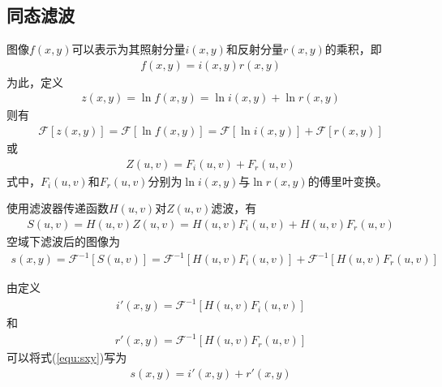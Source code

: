 \documentclass{hitreport}
\begin{document}
\subsection{同态滤波}\label{sec:tongtai}

图像$f\left(x,y\right)$可以表示为其照射分量$i\left(x,y\right)$和反射分量$r\left(x,y\right)$的乘积，即
\begin{align}
f\left(x,y\right) = i\left(x,y\right)r\left(x,y\right)
\end{align}
为此，定义
\begin{align}
z\left(x,y\right) = \ln f\left(x,y\right) = \ln i\left(x,y\right) + \ln r\left(x,y\right)
\end{align}
则有
\begin{align}
\mathscr{F}\left[z\left(x,y\right)\right] = \mathscr{F}\left[\ln f\left(x,y\right)\right] = \mathscr{F}\left[\ln i\left(x,y\right)\right] + \mathscr{F}\left[r\left(x,y\right)\right]
\end{align}
或
\begin{align}
Z\left(u,v\right) = F_i\left(u,v\right) + F_r\left(u,v\right)
\end{align}
式中，$F_i\left(u,v\right)$和$F_r\left(u,v\right)$分别为$\ln i\left(x,y\right)$与$\ln r\left(x,y\right)$的傅里叶变换。

使用滤波器传递函数$H\left(u,v\right)$对$Z\left(u,v\right)$滤波，有
\begin{align}
S\left(u,v\right) = H\left(u,v\right)Z\left(u,v\right) = H\left(u,v\right)F_i\left(u,v\right) + H\left(u,v\right)F_r\left(u,v\right)
\end{align}
空域下滤波后的图像为
\begin{align}\label{equ:sxy}
s\left(x,y\right) = \mathscr{F}^{-1}\left[S\left(u,v\right)\right] = \mathscr{F}^{-1}\left[H\left(u,v\right)F_i\left(u,v\right)\right] + \mathscr{F}^{-1}\left[H\left(u,v\right)F_r\left(u,v\right)\right]
\end{align}

由定义
\begin{align}
i'\left(x,y\right) = \mathscr{F}^{-1}\left[H\left(u,v\right)F_i\left(u,v\right)\right]
\end{align}
和
\begin{align}
r'\left(x,y\right) = \mathscr{F}^{-1}\left[H\left(u,v\right)F_r\left(u,v\right)\right]
\end{align}
可以将式(\ref{equ:sxy})写为
\begin{align}
s\left(x,y\right) = i'\left(x,y\right) + r'\left(x,y\right)
\end{align}
\end{document}
